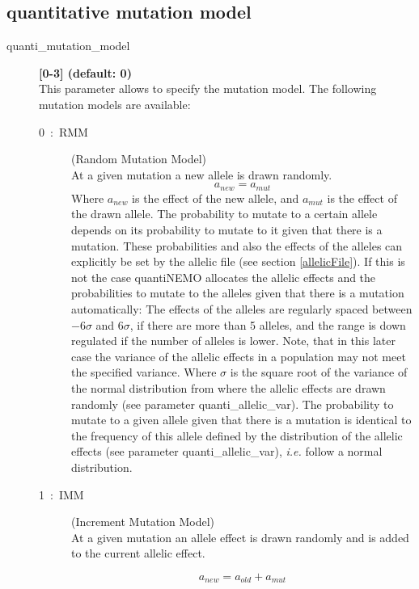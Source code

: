 \documentclass[letterpaper,12pt,oneside]{book}
\begin{document}
\subsection{quantitative mutation model}
\begin{description}
\item[quanti\_mutation\_model] \textbf{[0-3] (default: 0)}\\
This parameter allows to specify the mutation model. The following mutation models are available:
\begin{description}

\item[0~:~RMM] (Random Mutation Model)\\
At a given mutation a new allele is drawn randomly. 
	\[ a_{new} = a_{mut}    \]
Where $a_{new}$ is the effect of the new allele, and $a_{mut}$ is the effect of the drawn allele. The probability to mutate to a certain allele depends on its probability to mutate to it given that there is a mutation. These probabilities and also the effects of the alleles can explicitly be set by the allelic file (see section \ref{allelicFile}). If this is not the case quantiNEMO allocates the allelic effects and the probabilities to mutate to the alleles given that there is a mutation automatically: The effects of the alleles are regularly spaced between $-6\sigma$ and $6\sigma$, if there are more than 5 alleles, and the range is down regulated if the number of alleles is lower. Note, that in this later case the variance of the allelic effects in a population may not meet the specified variance.  Where $\sigma$ is the square root of the variance of the normal distribution from where the allelic effects are drawn randomly (see parameter \textsf{quanti\_allelic\_var}). The probability to mutate to a given allele given that there is a mutation is identical to the frequency of this allele defined by the distribution of the allelic effects (see parameter \textsf{quanti\_allelic\_var}), \textit{i.e.} follow a normal distribution.

\item[1~:~IMM] (Increment Mutation Model)\\
At a given mutation an allele effect is drawn randomly and is added to the current allelic effect. 

\[ a_{new} = a_{old} + a_{mut}    \]


\end{description}
\end{description}
\end{document}
